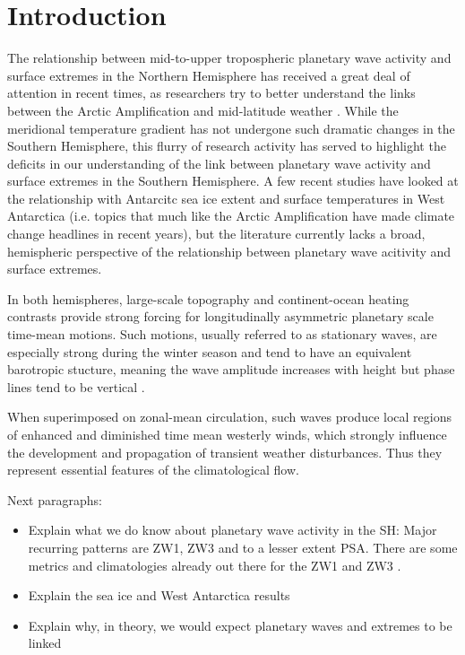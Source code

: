 \section{Introduction}\label{s:introduction}

The relationship between mid-to-upper tropospheric planetary wave activity and surface extremes in the Northern Hemisphere has received a great deal of attention in recent times, as researchers try to better understand the links between the Arctic Amplification and mid-latitude weather \citep[e.g.][]{Cohen2014,Screen2014}. While the meridional temperature gradient has not undergone such dramatic changes in the Southern Hemisphere, this flurry of research activity has served to highlight the deficits in our understanding of the link between planetary wave activity and surface extremes in the Southern Hemisphere. A few recent studies have looked at the relationship with Antarcitc sea ice extent \citep{Raphael2007,Raphael2014} and surface temperatures in West Antarctica \citep{Ding2011,Ding2013} (i.e. topics that much like the Arctic Amplification have made climate change headlines in recent years), but the literature currently lacks a broad, hemispheric perspective of the relationship between planetary wave acitivity and surface extremes. 

In both hemispheres, large-scale topography and continent-ocean heating contrasts provide strong forcing for longitudinally asymmetric planetary scale time-mean motions. Such motions, usually referred to as stationary waves, are especially strong during the winter season and tend to have an equivalent barotropic stucture, meaning the wave amplitude increases with height but phase lines tend to be vertical \citep{Holton2013}. 



When superimposed on zonal-mean circulation, such waves produce local regions of enhanced and diminished time mean westerly winds, which strongly influence the development and propagation of transient weather disturbances. Thus they represent essential features of the climatological flow.

Next paragraphs:
\begin{itemize}
\item Explain what we do know about planetary wave activity in the SH: Major recurring patterns are ZW1, ZW3 and to a lesser extent PSA. There are some metrics and climatologies already out there for the ZW1 and ZW3 \citep{Raphael2004,Hobbs2007}.
\item Explain the sea ice and West Antarctica results
\item Explain why, in theory, we would expect planetary waves and extremes to be linked
\end{itemize}
